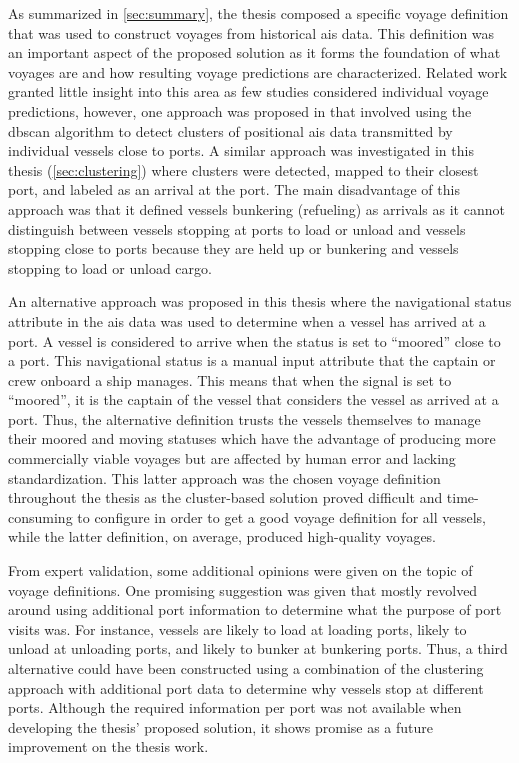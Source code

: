 As summarized in \cref{sec:summary}, the thesis composed a specific voyage definition that was used to construct voyages from historical \acrshort{ais} data. This definition was an important aspect of the proposed solution as it forms the foundation of what voyages are and how resulting voyage predictions are characterized. Related work granted little insight into this area as few studies considered individual voyage predictions, however, one approach was proposed in \cite{Zhang2020AISApproach} that involved using the \acrshort{dbscan} algorithm to detect clusters of positional \acrshort{ais} data transmitted by individual vessels close to ports. A similar approach was investigated in this thesis (\cref{sec:clustering}) where clusters were detected, mapped to their closest port, and labeled as an arrival at the port. The main disadvantage of this approach was that it defined vessels bunkering (refueling) as arrivals as it cannot distinguish between vessels stopping at ports to load or unload and vessels stopping close to ports because they are held up or bunkering and vessels stopping to load or unload cargo.

An alternative approach was proposed in this thesis where the navigational status attribute in the \acrshort{ais} data was used to determine when a vessel has arrived at a port. A vessel is considered to arrive when the status is set to ``moored'' close to a port. This navigational status is a manual input attribute that the captain or crew onboard a ship manages. This means that when the signal is set to ``moored'', it is the captain of the vessel that considers the vessel as arrived at a port. Thus, the alternative definition trusts the vessels themselves to manage their moored and moving statuses which have the advantage of producing more commercially viable voyages but are affected by human error and lacking standardization. This latter approach was the chosen voyage definition throughout the thesis as the cluster-based solution proved difficult and time-consuming to configure in order to get a good voyage definition for all vessels, while the latter definition, on average, produced high-quality voyages.

From expert validation, some additional opinions were given on the topic of voyage definitions. One promising suggestion was given that mostly revolved around using additional port information to determine what the purpose of port visits was. For instance, vessels are likely to load at loading ports, likely to unload at unloading ports, and likely to bunker at bunkering ports. Thus, a third alternative could have been constructed using a combination of the clustering approach with additional port data to determine why vessels stop at different ports. Although the required information per port was not available when developing the thesis' proposed solution, it shows promise as a future improvement on the thesis work.

